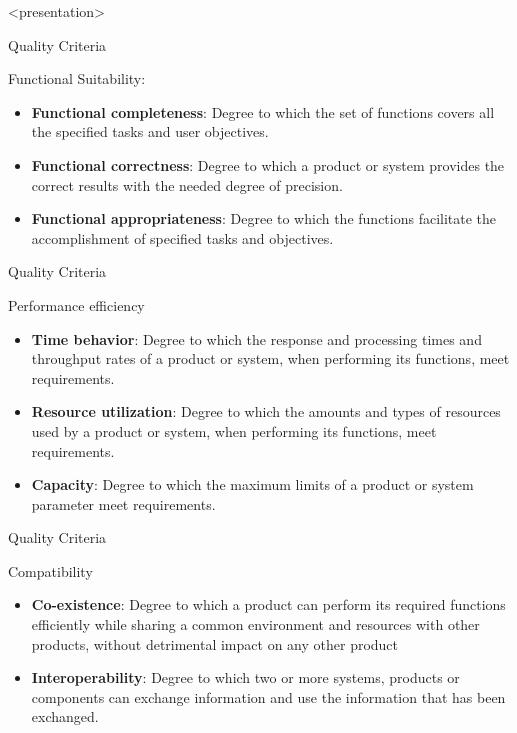 \mode
<presentation>
\plain{
	\centering
	\resizebox{!}{.95\textheight}{%
		
	}%
}

\begin{frame}{Quality Criteria}
	
	Functional Suitability:
	\begin{itemize}
		\item \textbf{Functional completeness}: Degree to which the set of functions covers all the specified tasks and user objectives.
		\item \textbf{Functional correctness}: Degree to which a product or system provides the correct results with the needed degree of precision.
		\item \textbf{Functional appropriateness}: Degree to which the functions facilitate the accomplishment of specified tasks and objectives.
	\end{itemize}
\end{frame}


\begin{frame}{Quality Criteria}
	
	Performance efficiency
	\begin{itemize}
		\item \textbf{Time behavior}: Degree to which the response and processing times and throughput rates of a product or system, when performing its functions, meet requirements.
		\item \textbf{Resource utilization}: Degree to which the amounts and types of resources used by a product or system, when performing its functions, meet requirements.
		\item \textbf{Capacity}: Degree to which the maximum limits of a product or system parameter meet requirements.
	\end{itemize}
\end{frame}


\begin{frame}{Quality Criteria}
	
	Compatibility
	\begin{itemize}
		\item \textbf{Co-existence}: Degree to which a product can perform its required functions efficiently while sharing a common environment and resources with other products, without detrimental impact on any other product
		\item \textbf{Interoperability}: Degree to which two or more systems, products or components can exchange information and use the information that has been exchanged.
	\end{itemize}
\end{frame}



